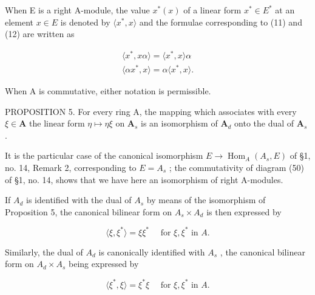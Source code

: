 When E is a right A-module, the value \(x^{*}(x)\) of a linear form \(x^{*} \in E^{*}\) at an element \(x \in E\) is denoted by \(\langle x^{*}, x \rangle\) and the formulae corresponding to (11) and (12) are written as

\[
\begin{array}{l} \langle x ^ {*}, x \alpha \rangle = \langle x ^ {*}, x \rangle \alpha \\ \langle \alpha x ^ {*}, x \rangle = \alpha \langle x ^ {*}, x \rangle . \end{array}
\]

When A is commutative, either notation is permissible.

PROPOSITION 5. For every ring A, the mapping which associates with every \(\xi\in\mathbf{A}\) the linear form \(\eta\mapsto\eta\xi\) on \(\mathbf{A}_{s}\) is an isomorphism of \(\mathbf{A}_{d}\) onto the dual of \(\mathbf{A}_{s}\) .

It is the particular case of the canonical isomorphism \(E \to \operatorname{Hom}_{A}(A_{s}, E)\) of §1, no. 14, Remark 2, corresponding to \(E = A_{s}\) ; the commutativity of diagram (50) of §1, no. 14, shows that we have here an isomorphism of right A-modules.

If \(A_{d}\) is identified with the dual of \(A_{s}\) by means of the isomorphism of Proposition 5, the canonical bilinear form on \(A_{s} \times A_{d}\) is then expressed by

\[
\langle \xi , \xi^ {*} \rangle = \xi \xi^ {*} \quad \text { for } \xi , \xi^ {*} \text { in } A.\tag{13}
\]

Similarly, the dual of \(A_{d}\) is canonically identified with \(A_{s}\) , the canonical bilinear form on \(A_{d} \times A_{s}\) being expressed by

\[
\langle \xi^ {*}, \xi \rangle = \xi^ {*} \xi \quad \text { for } \xi , \xi^ {*} \text { in } A.\tag{14}
\]

